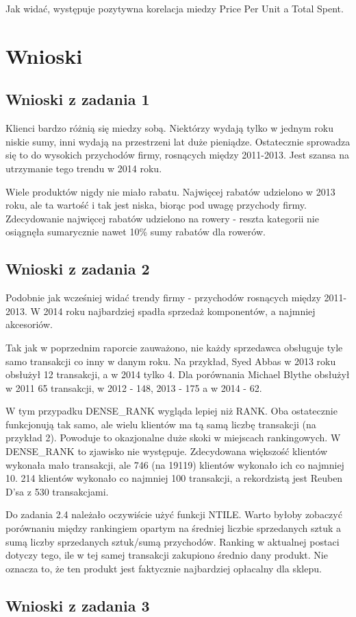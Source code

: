 \documentclass[a4paper,12pt]{article}
\begin{document}
Jak widać, występuje pozytywna korelacja miedzy Price Per Unit a Total Spent.

\section{Wnioski}

\subsection{Wnioski z zadania 1}

Klienci bardzo różnią się miedzy sobą. Niektórzy wydają tylko w jednym roku niskie sumy, inni wydają na przestrzeni lat duże pieniądze. Ostatecznie sprowadza się to do wysokich przychodów firmy, rosnących między 2011-2013. Jest szansa na utrzymanie tego trendu w 2014 roku.

Wiele produktów nigdy nie miało rabatu. Najwięcej rabatów udzielono w 2013 roku, ale ta wartość i tak jest niska, biorąc pod uwagę przychody firmy.
Zdecydowanie najwięcej rabatów udzielono na rowery - reszta kategorii nie osiągnęła sumarycznie nawet 10\% sumy rabatów dla rowerów.

\subsection{Wnioski z zadania 2}

Podobnie jak wcześniej widać trendy firmy - przychodów rosnących między 2011-2013. W 2014 roku najbardziej spadła sprzedaż komponentów, a najmniej akcesoriów.

Tak jak w poprzednim raporcie zauważono, nie każdy sprzedawca obsługuje tyle samo transakcji co inny w danym roku. Na przykład, Syed Abbas w 2013 roku obsłużył 12 transakcji, a w 2014 tylko 4. Dla porównania Michael Blythe obsłużył w 2011 65 transakcji, w 2012 - 148, 2013 - 175 a w 2014 - 62.

W tym przypadku DENSE\_RANK wygląda lepiej niż RANK. Oba ostatecznie funkcjonują tak samo, ale wielu klientów ma tą samą liczbę transakcji (na przykład 2). Powoduje to okazjonalne duże skoki w miejscach rankingowych. W DENSE\_RANK to zjawisko nie występuje. Zdecydowana większość klientów wykonała mało transakcji, ale 746 (na 19119) klientów wykonało ich co najmniej 10. 214 klientów wykonało co najmniej 100 transakcji, a rekordzistą jest Reuben D'sa z 530 transakcjami.

Do zadania 2.4 należało oczywiście użyć funkcji NTILE. Warto byłoby zobaczyć porównaniu między rankingiem opartym na średniej liczbie sprzedanych sztuk a sumą liczby sprzedanych sztuk/sumą przychodów. Ranking w aktualnej postaci dotyczy tego, ile w tej samej transakcji zakupiono średnio dany produkt. Nie oznacza to, że ten produkt jest faktycznie najbardziej opłacalny dla sklepu.

\subsection{Wnioski z zadania 3}

\printbibliography
\end{document}
